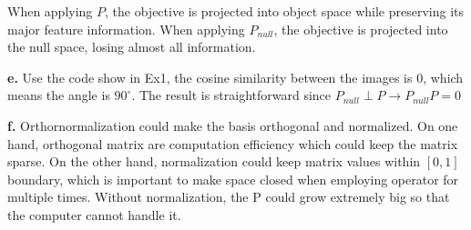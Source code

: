 \documentclass[11pt,a4paper]{article}
\begin{document}
When applying $P$, the objective is projected into object space while preserving its major feature information. When applying $P_{null}$, the objective is projected into the null space, losing almost all information.

\textbf{e.} Use the code show in Ex1, the cosine similarity between the images is 0, which means the angle is $90^\circ$. The result is straightforward since $P_{null}\perp P\rightarrow P_{null}P=0$

\textbf{f.} Orthornormalization could make the basis orthogonal and normalized. On one hand, orthogonal matrix are computation efficiency which could keep the matrix sparse. On the other hand, normalization could keep matrix values within $[0,1]$ boundary, which is important to make space closed when employing operator for multiple times. Without normalization, the P could grow extremely big so that the computer cannot handle it. 
\end{document}
